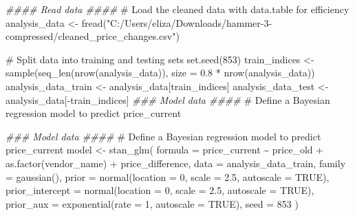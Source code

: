 \documentclass[
  letterpaper,
  DIV=11,
  numbers=noendperiod]{scrartcl}
\newenvironment{Shaded}{\begin{snugshade}}{\end{snugshade}}
\newcommand{\AttributeTok}[1]{\textcolor[rgb]{0.40,0.45,0.13}{#1}}
\newcommand{\CommentTok}[1]{\textcolor[rgb]{0.37,0.37,0.37}{#1}}
\newcommand{\ConstantTok}[1]{\textcolor[rgb]{0.56,0.35,0.01}{#1}}
\newcommand{\DecValTok}[1]{\textcolor[rgb]{0.68,0.00,0.00}{#1}}
\newcommand{\DocumentationTok}[1]{\textcolor[rgb]{0.37,0.37,0.37}{\textit{#1}}}
\newcommand{\FloatTok}[1]{\textcolor[rgb]{0.68,0.00,0.00}{#1}}
\newcommand{\FunctionTok}[1]{\textcolor[rgb]{0.28,0.35,0.67}{#1}}
\newcommand{\NormalTok}[1]{\textcolor[rgb]{0.00,0.23,0.31}{#1}}
\newcommand{\OtherTok}[1]{\textcolor[rgb]{0.00,0.23,0.31}{#1}}
\newcommand{\SpecialCharTok}[1]{\textcolor[rgb]{0.37,0.37,0.37}{#1}}
\newcommand{\StringTok}[1]{\textcolor[rgb]{0.13,0.47,0.30}{#1}}
\begin{document}
\begin{Shaded}
\begin{Highlighting}[]
\DocumentationTok{\#\#\#\# Read data \#\#\#\#}
\CommentTok{\# Load the cleaned data with data.table for efficiency}
\NormalTok{analysis\_data }\OtherTok{\textless{}{-}} \FunctionTok{fread}\NormalTok{(}\StringTok{"C:/Users/eliza/Downloads/hammer{-}3{-}compressed/cleaned\_price\_changes.csv"}\NormalTok{)}

\CommentTok{\# Split data into training and testing sets}
\FunctionTok{set.seed}\NormalTok{(}\DecValTok{853}\NormalTok{)}
\NormalTok{train\_indices }\OtherTok{\textless{}{-}} \FunctionTok{sample}\NormalTok{(}\FunctionTok{seq\_len}\NormalTok{(}\FunctionTok{nrow}\NormalTok{(analysis\_data)), }\AttributeTok{size =} \FloatTok{0.8} \SpecialCharTok{*} \FunctionTok{nrow}\NormalTok{(analysis\_data))}
\NormalTok{analysis\_data\_train }\OtherTok{\textless{}{-}}\NormalTok{ analysis\_data[train\_indices]}
\NormalTok{analysis\_data\_test }\OtherTok{\textless{}{-}}\NormalTok{ analysis\_data[}\SpecialCharTok{{-}}\NormalTok{train\_indices]}
\DocumentationTok{\#\#\# Model data \#\#\#\#}
\CommentTok{\# Define a Bayesian regression model to predict \textasciigrave{}price\_current\textasciigrave{}}

\DocumentationTok{\#\#\# Model data \#\#\#\#}
\CommentTok{\# Define a Bayesian regression model to predict \textasciigrave{}price\_current\textasciigrave{}}
\NormalTok{model }\OtherTok{\textless{}{-}} \FunctionTok{stan\_glm}\NormalTok{(}
  \AttributeTok{formula =}\NormalTok{ price\_current }\SpecialCharTok{\textasciitilde{}}\NormalTok{ price\_old }\SpecialCharTok{+} \FunctionTok{as.factor}\NormalTok{(vendor\_name) }\SpecialCharTok{+}\NormalTok{ price\_difference,}
  \AttributeTok{data =}\NormalTok{ analysis\_data\_train,}
  \AttributeTok{family =} \FunctionTok{gaussian}\NormalTok{(),}
  \AttributeTok{prior =} \FunctionTok{normal}\NormalTok{(}\AttributeTok{location =} \DecValTok{0}\NormalTok{, }\AttributeTok{scale =} \FloatTok{2.5}\NormalTok{, }\AttributeTok{autoscale =} \ConstantTok{TRUE}\NormalTok{),}
  \AttributeTok{prior\_intercept =} \FunctionTok{normal}\NormalTok{(}\AttributeTok{location =} \DecValTok{0}\NormalTok{, }\AttributeTok{scale =} \FloatTok{2.5}\NormalTok{, }\AttributeTok{autoscale =} \ConstantTok{TRUE}\NormalTok{),}
  \AttributeTok{prior\_aux =} \FunctionTok{exponential}\NormalTok{(}\AttributeTok{rate =} \DecValTok{1}\NormalTok{, }\AttributeTok{autoscale =} \ConstantTok{TRUE}\NormalTok{),}
  \AttributeTok{seed =} \DecValTok{853}
\NormalTok{)}
\end{Highlighting}
\end{Shaded}
\end{document}
